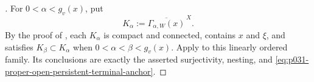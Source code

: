 \begin{proof}[]
For $0<\alpha<g_v(x)$, put
\[
             K_\alpha
               :=\overline{\Gamma_{\alpha,W}(x)}^{\,X}.
\]
By the proof of
, each $K_\alpha$ is
compact and connected, contains $x$ and $\xi$, and satisfies
$K_\beta\subset K_\alpha$ when $0<\alpha<\beta<g_v(x)$.  Apply
 to this linearly
ordered family.  Its conclusions are exactly the asserted surjectivity,
nesting, and \eqref{eq:p031-proper-open-persistent-terminal-anchor}.
\end{proof}
